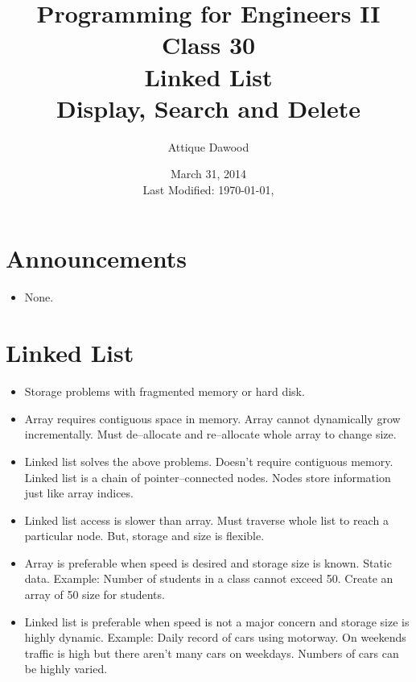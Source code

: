 \documentclass[12pt,a4paper]{article}
\title{\vspace{-2cm}Programming for Engineers II\\Class 30\\Linked List\\Display, Search and Delete}
\author{Attique Dawood}
\date{March 31, 2014\\[0.2cm] Last Modified: \today, \currenttime}
\begin{document}
\maketitle
\section{Announcements}
\begin{itemize}
\item None.
\end{itemize}
\section{Linked List}
\begin{itemize}
\item Storage problems with fragmented memory or hard disk.
\item Array requires contiguous space in memory. Array cannot dynamically grow incrementally. Must de--allocate and re--allocate whole array to change size.
\item Linked list solves the above problems. Doesn't require contiguous memory. Linked list is a chain of pointer--connected nodes. Nodes store information just like array indices.
\item Linked list access is slower than array. Must traverse whole list to reach a particular node. But, storage and size is flexible.
\item Array is preferable when speed is desired and storage size is known. Static data. Example: Number of students in a class cannot exceed 50. Create an array of 50 size for students.
\item Linked list is preferable when speed is not a major concern and storage size is highly dynamic. Example: Daily record of cars using motorway. On weekends traffic is high but there aren't many cars on weekdays. Numbers of cars can be highly varied.
\end{itemize}
\end{document}
